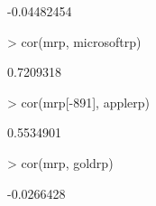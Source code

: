 \documentclass[12pt, a14paper, lithuanian]{article}
\begin{document}
\begin{Schunk}
\begin{Soutput}
[1] -0.04482454
\end{Soutput}
\begin{Sinput}
> cor(mrp, microsoftrp)
\end{Sinput}
\begin{Soutput}
[1] 0.7209318
\end{Soutput}
\begin{Sinput}
> cor(mrp[-891], applerp)
\end{Sinput}
\begin{Soutput}
[1] 0.5534901
\end{Soutput}
\begin{Sinput}
> cor(mrp, goldrp)
\end{Sinput}
\begin{Soutput}
[1] -0.0266428
\end{Soutput}
\end{Schunk}
\end{document}

